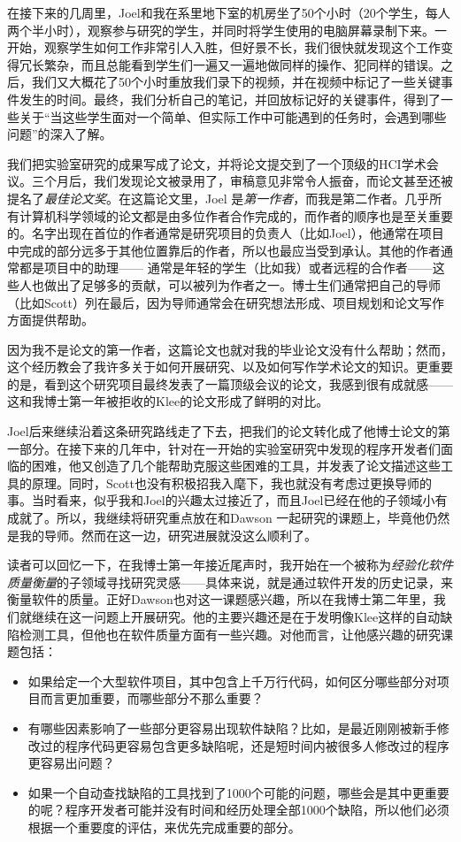 \documentclass[12pt,UTF8,nofonts]{book}
\begin{document}
在接下来的几周里，Joel和我在系里地下室的机房坐了50个小时（20个学生，每人两个半小时），观察参与研究的学生，并同时将学生使用的电脑屏幕录制下来。一开始，观察学生如何工作非常引人入胜，但好景不长，我们很快就发现这个工作变得冗长繁杂，而且总能看到学生们一遍又一遍地做同样的操作、犯同样的错误。之后，我们又大概花了50个小时重放我们录下的视频，并在视频中标记了一些关键事件发生的时间。最终，我们分析自己的笔记，并回放标记好的关键事件，得到了一些关于“当这些学生面对一个简单、但实际工作中可能遇到的任务时，会遇到哪些问题”的深入了解。

我们把实验室研究的成果写成了论文，并将论文提交到了一个顶级的HCI学术会议。三个月后，我们发现论文被录用了，审稿意见非常令人振奋，而论文甚至还被提名了\emph{最佳论文奖}。在这篇论文里，Joel 是\emph{第一作者}，而我是第二作者。几乎所有计算机科学领域的论文都是由多位作者合作完成的，而作者的顺序也是至关重要的。名字出现在首位的作者通常是研究项目的负责人（比如Joel），他通常在项目中完成的部分远多于其他位置靠后的作者，所以也最应当受到承认。其他的作者通常都是项目中的助理—— 通常是年轻的学生（比如我）或者远程的合作者——这些人也做出了足够多的贡献，可以被列为作者之一。博士生们通常把自己的导师（比如Scott）列在最后，因为导师通常会在研究想法形成、项目规划和论文写作方面提供帮助。

因为我不是论文的第一作者，这篇论文也就对我的毕业论文没有什么帮助；然而，这个经历教会了我许多关于如何开展研究、以及如何写作学术论文的知识。更重要的是，看到这个研究项目最终发表了一篇顶级会议的论文，我感到很有成就感——这和我博士第一年被拒收的Klee的论文形成了鲜明的对比。

Joel后来继续沿着这条研究路线走了下去，把我们的论文转化成了他博士论文的第一部分。在接下来的几年中，针对在一开始的实验室研究中发现的程序开发者们面临的困难，他又创造了几个能帮助克服这些困难的工具，并发表了论文描述这些工具的原理。同时，Scott也没有积极招我入麾下，我也就没有考虑过更换导师的事。当时看来，似乎我和Joel的兴趣太过接近了，而且Joel已经在他的子领域小有成就了。所以，我继续将研究重点放在和Dawson 一起研究的课题上，毕竟他仍然是我的导师。然而在这一边，研究进展就没这么顺利了。

\breakline

读者可以回忆一下，在我博士第一年接近尾声时，我开始在一个被称为\emph{经验化软件质量衡量}的子领域寻找研究灵感——具体来说，就是通过软件开发的历史记录，来衡量软件的质量。正好Dawson也对这一课题感兴趣，所以在我博士第二年里，我们就继续在这一问题上开展研究。他的主要兴趣还是在于发明像Klee这样的自动缺陷检测工具，但他也在软件质量方面有一些兴趣。对他而言，让他感兴趣的研究课题包括：

\begin{itemize}
\item 如果给定一个大型软件项目，其中包含上千万行代码，如何区分哪些部分对项目而言更加重要，而哪些部分不那么重要？
\item 有哪些因素影响了一些部分更容易出现软件缺陷？比如，是最近刚刚被新手修改过的程序代码更容易包含更多缺陷呢，还是短时间内被很多人修改过的程序更容易出问题？
\item 如果一个自动查找缺陷的工具找到了1000个可能的问题，哪些会是其中更重要的呢？程序开发者可能并没有时间和经历处理全部1000个缺陷，所以他们必须根据一个重要度的评估，来优先完成重要的部分。
\end{itemize}
\end{document}
